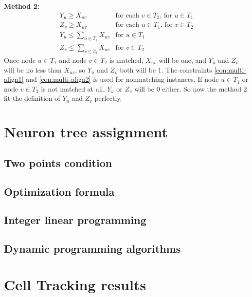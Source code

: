 \textbf{Method 2:}
\begin{eqnarray}
Y_u \ge X_{uv} &\text{for each $v \in T_2$, for $u \in T_1$}\\
Z_v \ge X_{uv} & \text{for each $u \in T_1$, for $v \in T_2$}\\
\label{con:multi-align1}
Y_u \le \sum\limits_{u \in T_1}X_{uv}  & \text{for $u \in T_1$}\\
\label{con:multi-align2}
Z_v \le \sum\limits_{v \in T_2}X_{uv}  & \text{for $v \in T_2$}
\end{eqnarray}
Once node $u \in T_1$ and node $v \in T_2$ is matched, $X_{uv}$ will be one, and $Y_u$ and $Z_v$ will be no less than $X_{uv}$, so $Y_u$ and $Z_v$ both will be 1. The constraints \ref{con:multi-align1} and \ref{con:multi-align2} is used for nonmatching instances. If node $u \in T_1$ or node $v \in T_2$ is not matched at all, $Y_u$ or $Z_v$ will be 0 either. So now the method 2 fit the definition of $Y_u$ and $Z_v$ perfectly.

\section{Neuron tree assignment}
\subsection{Two points condition}
\subsection{Optimization formula}
\subsection{Integer linear programming}
\subsection{Dynamic programming algorithms}
\section{Cell Tracking results}
